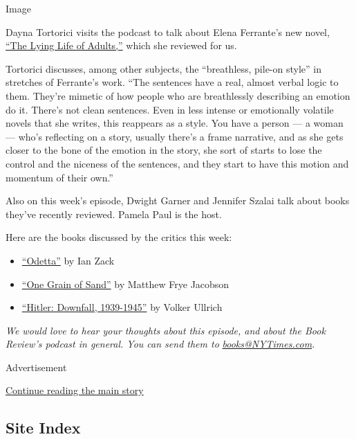 Image

Dayna Tortorici visits the podcast to talk about Elena Ferrante's new
novel,
\href{https://www.nytimes3xbfgragh.onion/2020/09/01/books/review/elena-ferrante-the-lying-life-of-adults.html}{``The
Lying Life of Adults,''} which she reviewed for us.

Tortorici discusses, among other subjects, the ``breathless, pile-on
style'' in stretches of Ferrante's work. ``The sentences have a real,
almost verbal logic to them. They're mimetic of how people who are
breathlessly describing an emotion do it. There's not clean sentences.
Even in less intense or emotionally volatile novels that she writes,
this reappears as a style. You have a person --- a woman --- who's
reflecting on a story, usually there's a frame narrative, and as she
gets closer to the bone of the emotion in the story, she sort of starts
to lose the control and the niceness of the sentences, and they start to
have this motion and momentum of their own.''

Also on this week's episode, Dwight Garner and Jennifer Szalai talk
about books they've recently reviewed. Pamela Paul is the host.

Here are the books discussed by the critics this week:

\begin{itemize}
\item
  \href{https://www.nytimes3xbfgragh.onion/2020/08/24/books/review-odetta-biography-ian-zack-one-grain-of-sand-matthew-frye-jacobson.html}{``Odetta''}
  by Ian Zack
\item
  \href{https://www.nytimes3xbfgragh.onion/2020/08/24/books/review-odetta-biography-ian-zack-one-grain-of-sand-matthew-frye-jacobson.html}{``One
  Grain of Sand''} by Matthew Frye Jacobson
\item
  \href{https://www.nytimes3xbfgragh.onion/2020/08/26/books/review-hitler-downfall-volker-ullrich.html}{``Hitler:
  Downfall, 1939-1945''} by Volker Ullrich
\end{itemize}

\emph{We would love to hear your thoughts about this episode, and about
the Book Review's podcast in general. You can send them to}
\href{mailto:books@NYTimes.com}{\emph{books@NYTimes.com}}\emph{.}

Advertisement

\protect\hyperlink{after-bottom}{Continue reading the main story}

\hypertarget{site-index}{%
\subsection{Site Index}\label{site-index}}

